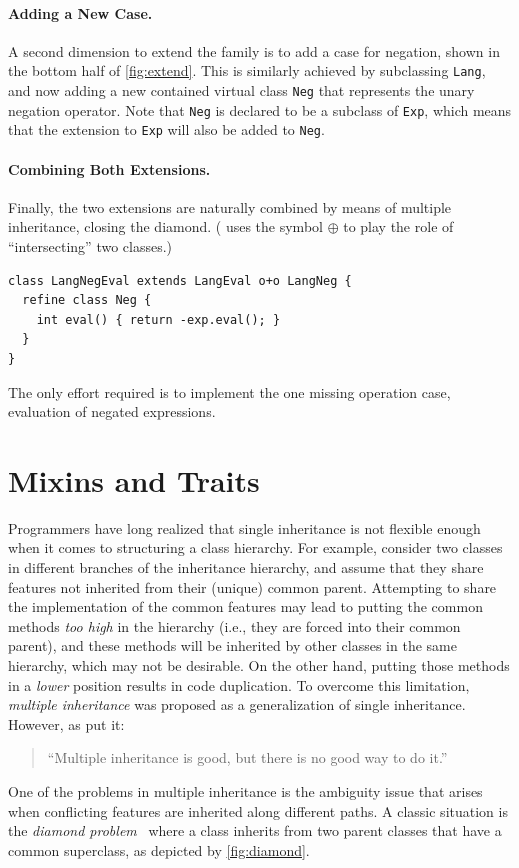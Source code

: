 \paragraph{Adding a New Case.}

A second dimension to extend the family is to add a case for negation, shown in
the bottom half of \cref{fig:extend}. This is similarly achieved by subclassing
\lstinline{Lang}, and now adding a new contained virtual class \lstinline{Neg}
that represents the unary negation operator. Note that \lstinline{Neg} is
declared to be a subclass of \lstinline{Exp}, which means that the extension to
\lstinline{Exp} will also be added to \lstinline{Neg}.


\paragraph{Combining Both Extensions.}

Finally, the two extensions are naturally combined by means of multiple
inheritance, closing the diamond. (\citeauthor{ernst2004expression} uses the
symbol $\oplus$ to play the role of ``intersecting'' two classes.)
\begin{lstlisting}[language=gbeta]
class LangNegEval extends LangEval o+o LangNeg {
  refine class Neg {
    int eval() { return -exp.eval(); }
  }
}
\end{lstlisting}
The only effort required is to implement the one missing operation
case, evaluation of negated expressions.


\section{Mixins and Traits}
\label{sec:bg:mixin:trait}


Programmers have long realized that single inheritance is not flexible enough
when it comes to structuring a class hierarchy. For example, consider two
classes in different branches of the inheritance hierarchy, and assume that they
share features not inherited from their (unique) common parent. Attempting to
share the implementation of the common features may lead to putting the common
methods \textit{too high} in the hierarchy (i.e., they are forced into their
common parent), and these methods will be inherited by other classes in the same
hierarchy, which may not be desirable. On the other hand, putting those methods
in a \textit{lower} position results in code duplication. To overcome this
limitation, \textit{multiple inheritance} was proposed as a generalization of
single inheritance. However, as \citet{cook:multi} put it:
\begin{quote}
  ``Multiple inheritance is good, but there is no good way to do it.''
\end{quote}
One of the problems in multiple inheritance is the ambiguity issue that arises
when conflicting features are inherited along different paths. A classic
situation is the \emph{diamond problem}~\citep{bracha1990mixin} where a class
inherits from two parent classes that have a common superclass, as depicted by
\cref{fig:diamond}.


